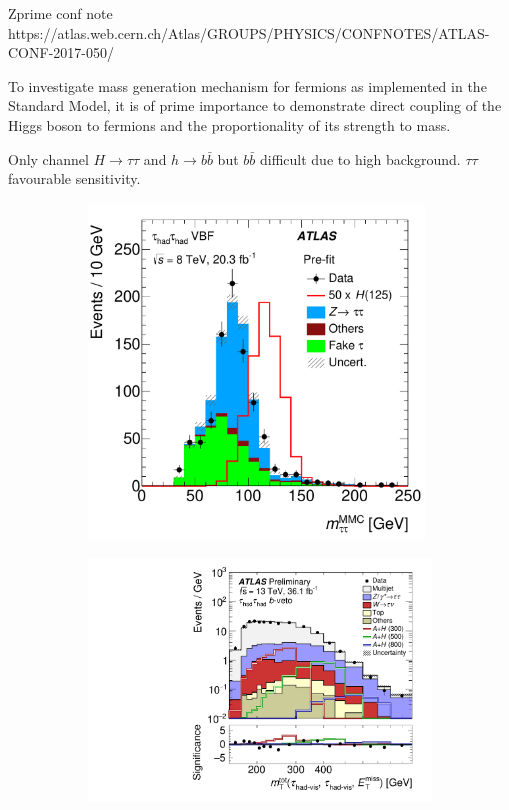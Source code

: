 Zprime conf note
https://atlas.web.cern.ch/Atlas/GROUPS/PHYSICS/CONFNOTES/ATLAS-CONF-2017-050/



To investigate mass generation mechanism for fermions as implemented in the
Standard Model, it is of prime importance to demonstrate direct coupling of the
Higgs boson to fermions and the proportionality of its strength to mass.

Only channel $H \to \tau \tau$ and $h \to b \bar{b}$ but $b \bar{b}$
difficult due to high background. $\tau\tau$ favourable sensitivity.

\begin{figure}[htbp]
  \begin{subfigure}[t]{0.48\textwidth}
    \centering
    \includegraphics[width=0.98\textwidth]{./figures/theory/htautau_mass_2.pdf}
  \end{subfigure}\hfill
  \begin{subfigure}[t]{0.48\textwidth}
    \centering
    \includegraphics[width=1.0\textwidth]{./figures/theory/zprime_mttot.pdf}

\end{subfigure}
\end{figure}
